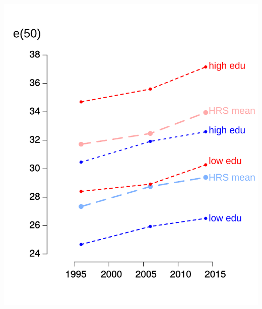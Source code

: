 \documentclass[20pt,usenames,dvipsnames]{beamer}
\begin{document}
\begin{frame}[plain]
\vspace{-1em}
\begin{center}
\includegraphics[height=20cm, keepaspectratio]{Figures/e50_2.pdf}
\end{center}
\end{frame}
\end{document}

